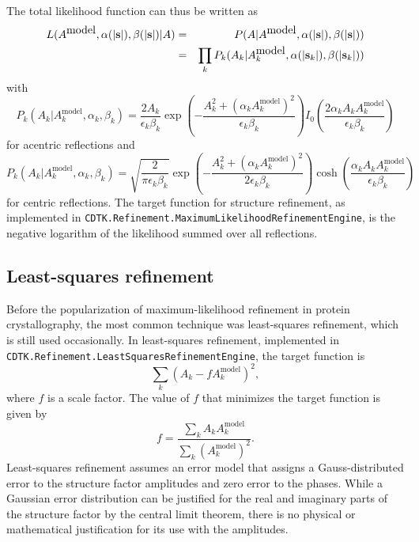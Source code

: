 \documentclass[12pt]{article}
\newcommand{\vect}[1]{{\bf #1}}
\newcommand{\vs}{\vect{s}}
\begin{document}
\begin{sloppy}
The total likelihood function can thus be written as
\begin{eqnarray}
L(A^{\mbox{model}}, \alpha(|\vs|), \beta(|\vs|) | A) 
 &=&   P(A | A^{\mbox{model}}, \alpha(|\vs|), \beta(|\vs|)) \nonumber \\
 &=&  \prod_{k} P_k(A_k | A_k^{\mbox{model}}, \alpha(|\vs_k|), \beta(|\vs_k|))
\end{eqnarray}
with
\begin{equation}
P_k(A_k | A_k^{\mbox{model}}, \alpha_k, \beta_k) =
  \frac{2 A_k}{\epsilon_k\beta_k}
  \exp\left(-\frac{A_k^2+\left(\alpha_k A_k^{\mbox{model}}\right)^2}
                  {\epsilon_k \beta_k}\right)
  I_0\left(\frac{2 \alpha_k A_k A_k^{\mbox{model}}}{\epsilon_k \beta_k}\right)
\end{equation}
for acentric reflections and
\begin{equation}
P_k(A_k | A_k^{\mbox{model}}, \alpha_k, \beta_k) =
  \sqrt{\frac{2}{\pi\epsilon_k\beta_k}}
  \exp\left(-\frac{A_k^2+\left(\alpha_k A_k^{\mbox{model}}\right)^2}
                  {2\epsilon_k \beta_k}\right)
  \cosh\left(\frac{\alpha_k A_k A_k^{\mbox{model}}}{\epsilon_k \beta_k}\right)
\end{equation}
for centric reflections. The target function for structure refinement,
as implemented in
\texttt{CDTK.Refinement.MaximumLikelihoodRefinementEngine}, is the
negative logarithm of the likelihood summed over all reflections.

\subsection{Least-squares refinement}

Before the popularization of maximum-likelihood refinement in protein
crystallography, the most common technique was least-squares
refinement, which is still used occasionally. In least-squares
refinement, implemented in
\texttt{CDTK.Refinement.LeastSquaresRefinementEngine},
the target function is
\begin{equation}
\sum_k \left( A_k - f A_k^{\mbox{model}}\right)^2,
\end{equation}
where $f$ is a scale factor. The value of $f$ that minimizes the target
function is given by
\begin{equation}
f = \frac{\sum_k A_k  A_k^{\mbox{model}}}
         {\sum_k \left(A_k^{\mbox{model}}\right)^2}.
\end{equation}
Least-squares refinement assumes an error model that assigns a
Gauss-distributed error to the structure factor amplitudes and zero
error to the phases. While a Gaussian error distribution can be
justified for the real and imaginary parts of the structure factor by
the central limit theorem, there is no physical or mathematical
justification for its use with the amplitudes.

\end{sloppy}
\end{document}
